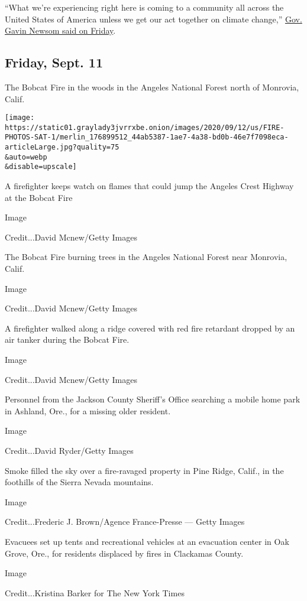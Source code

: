 ``What we're experiencing right here is coming to a community all across
the United States of America unless we get our act together on climate
change,''
\href{https://twitter.com/GavinNewsom/status/1304540902904348674}{Gov.
Gavin Newsom said on Friday}.

\hypertarget{friday-sept-11}{%
\subsection{Friday, Sept. 11}\label{friday-sept-11}}

The Bobcat Fire in the woods in the Angeles National Forest north of
Monrovia, Calif.

\texttt{[image: https://static01.graylady3jvrrxbe.onion/images/2020/09/12/us/FIRE-PHOTOS-SAT-1/merlin\_176899512\_44ab5387-1ae7-4a38-bd0b-46e7f7098eca-articleLarge.jpg?quality=75\\\&auto=webp\\\&disable=upscale]}

A firefighter keeps watch on flames that could jump the Angeles Crest
Highway at the Bobcat Fire

Image

Credit...David Mcnew/Getty Images

The Bobcat Fire burning trees in the Angeles National Forest near
Monrovia, Calif.

Image

Credit...David Mcnew/Getty Images

A firefighter walked along a ridge covered with red fire retardant
dropped by an air tanker during the Bobcat Fire.

Image

Credit...David Mcnew/Getty Images

Personnel from the Jackson County Sheriff's Office searching a mobile
home park in Ashland, Ore., for a missing older resident.

Image

Credit...David Ryder/Getty Images

Smoke filled the sky over a fire-ravaged property in Pine Ridge, Calif.,
in the foothills of the Sierra Nevada mountains.

Image

Credit...Frederic J. Brown/Agence France-Presse --- Getty Images

Evacuees set up tents and recreational vehicles at an evacuation center
in Oak Grove, Ore., for residents displaced by fires in Clackamas
County.

Image

Credit...Kristina Barker for The New York Times

